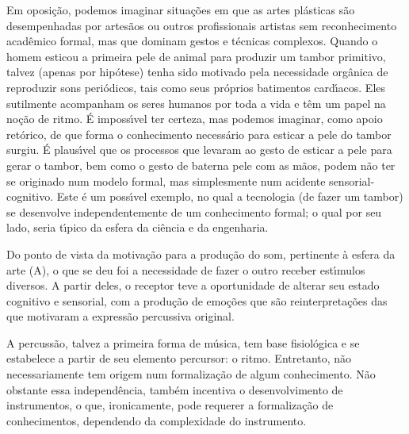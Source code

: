 \documentclass[
12pt,		%
openright,	%
twoside,  %
a4paper,			%
chapter=TITLE,		%
english,			%
french,				%
spanish,			%
brazil				%
]{USPSC-classe/USPSC}
\begin{document}
Em oposi\c{c}\~ao, podemos imaginar situa\c{c}\~oes em que as artes pl\'asticas s\~ao desempenhadas por artes\~aos ou outros profissionais artistas sem reconhecimento acad\^emico formal, mas que dominam gestos e t\'ecnicas complexos. Quando o homem esticou a primeira pele de animal para produzir um tambor primitivo, talvez (apenas por hip\'otese) tenha sido motivado pela necessidade org\^anica de reproduzir sons peri\'odicos, tais como seus pr\'oprios batimentos card\'{\i}acos. Eles sutilmente acompanham os seres humanos por toda a vida e t\^em um papel na no\c{c}\~ao de ritmo. \'E imposs\'{\i}vel ter certeza, mas podemos imaginar, como apoio ret\'orico, de que forma o conhecimento necess\'ario para esticar a pele do tambor surgiu. \'E plaus\'{\i}vel que os processos que levaram ao gesto de esticar a pele para gerar o tambor, bem como o gesto de \textquotedbl bater\textquotedbl  na pele com as m\~aos, podem n\~ao ter se originado num modelo formal, mas simplesmente num acidente sensorial-cognitivo. Este \'e um poss\'{\i}vel exemplo, no qual a tecnologia (de fazer um tambor) se desenvolve independentemente de um conhecimento formal; o qual por seu lado, seria t\'{\i}pico da esfera da ci\^encia e da engenharia.








Do ponto de vista da motiva\c{c}\~ao para a produ\c{c}\~ao do som, pertinente \`a esfera da arte (A), o que se deu foi a necessidade de fazer o outro receber est\'{\i}mulos diversos. A partir deles, o receptor teve a oportunidade de alterar seu estado cognitivo e sensorial, com a produ\c{c}\~ao de emo\c{c}\~oes que s\~ao reinterpreta\c{c}\~oes das que motivaram a express\~ao percussiva original.








A percuss\~ao, talvez a primeira forma de m\'usica, tem base fisiol\'ogica e se estabelece a partir de seu elemento percursor: o ritmo. Entretanto, n\~ao necessariamente tem origem num formaliza\c{c}\~ao de algum conhecimento. N\~ao obstante essa independ\^encia, tamb\'em incentiva o desenvolvimento de instrumentos, o que, ironicamente, pode requerer a formaliza\c{c}\~ao de conhecimentos, dependendo da complexidade do instrumento.
\end{document}
